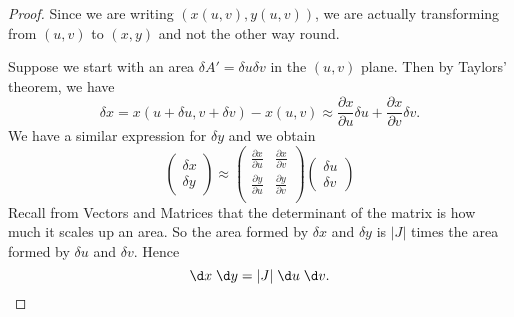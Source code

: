 \documentclass[a4paper]{article}
\begin{document}
\begin{proof}
  Since we are writing $(x(u, v), y(u, v))$, we are actually transforming from $(u, v)$ to $(x, y)$ and not the other way round.

  Suppose we start with an area $\delta A' = \delta u\delta v$ in the $(u, v)$ plane. Then by Taylors' theorem, we have
  \[
    \delta x = x(u + \delta u, v + \delta v) - x(u, v) \approx \frac{\partial x}{\partial u}\delta u + \frac{\partial x}{\partial v}\delta v.
  \]
  We have a similar expression for $\delta y$ and we obtain
  \[
    \begin{pmatrix}
      \delta x\\
      \delta y
    \end{pmatrix}
    \approx
    \begin{pmatrix}
      \frac{\partial x}{\partial u} & \frac{\partial x}{\partial v}\\
      \frac{\partial y}{\partial u} & \frac{\partial y}{\partial v}\\
    \end{pmatrix}
    \begin{pmatrix}
      \delta u\\
      \delta v
    \end{pmatrix}
  \]
  Recall from Vectors and Matrices that the determinant of the matrix is how much it scales up an area. So the area formed by $\delta x$ and $\delta y$ is $|J|$ times the area formed by $\delta u$ and $\delta v$. Hence
  \[
    \d x\;\d y = |J| \;\d u\;\d v.
  \]
\end{proof}
\end{document}
